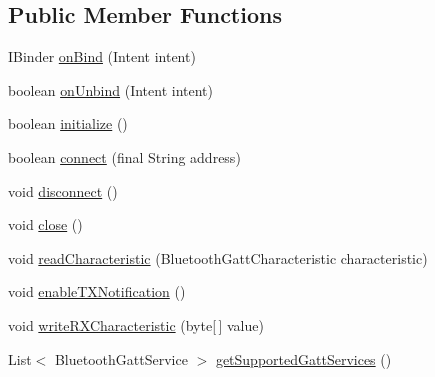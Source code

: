 \subsection*{Public Member Functions}
\begin{DoxyCompactItemize}
\item 
I\+Binder \hyperlink{classcom_1_1mdex_1_1venus_alpha01a_1_1_uart_service_af26c2be1d82ba32fcb1f754cd0c9d0c5}{on\+Bind} (Intent intent)
\item 
boolean \hyperlink{classcom_1_1mdex_1_1venus_alpha01a_1_1_uart_service_a029ce1ef24fc3904b888bd217f4b115e}{on\+Unbind} (Intent intent)
\item 
boolean \hyperlink{classcom_1_1mdex_1_1venus_alpha01a_1_1_uart_service_ae30e283bbee81ca4f91aaa430b624c16}{initialize} ()
\item 
boolean \hyperlink{classcom_1_1mdex_1_1venus_alpha01a_1_1_uart_service_ae8c6637fcc70c1784e6b9b1123d5cb36}{connect} (final String address)
\item 
void \hyperlink{classcom_1_1mdex_1_1venus_alpha01a_1_1_uart_service_a74a3d79f13944b102c44ca20ebd5ebcf}{disconnect} ()
\item 
void \hyperlink{classcom_1_1mdex_1_1venus_alpha01a_1_1_uart_service_ae7041fe20f64a554c2685cdc4c7d69b5}{close} ()
\item 
void \hyperlink{classcom_1_1mdex_1_1venus_alpha01a_1_1_uart_service_ae686ffe62ae7f32165905349636ce676}{read\+Characteristic} (Bluetooth\+Gatt\+Characteristic characteristic)
\item 
void \hyperlink{classcom_1_1mdex_1_1venus_alpha01a_1_1_uart_service_a18292c82804f4c2d4683cc5bda145076}{enable\+T\+X\+Notification} ()
\item 
void \hyperlink{classcom_1_1mdex_1_1venus_alpha01a_1_1_uart_service_a5002d54ae63dfb028521375291acc644}{write\+R\+X\+Characteristic} (byte\mbox{[}$\,$\mbox{]} value)
\item 
List$<$ Bluetooth\+Gatt\+Service $>$ \hyperlink{classcom_1_1mdex_1_1venus_alpha01a_1_1_uart_service_a8e61c0f9da4f1ad3f2f0d06ca9e09f26}{get\+Supported\+Gatt\+Services} ()
\end{DoxyCompactItemize}
